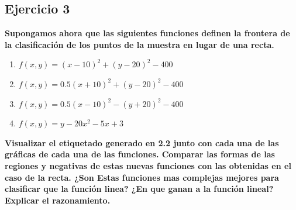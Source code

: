 \documentclass[titlepage]{article}
\begin{document}
\begin{enumerate}
	\end{enumerate}

	\subsection{Ejercicio 3}
	\textbf{Supongamos ahora que las siguientes funciones definen la frontera de la clasificación de los puntos de la muestra en lugar de una recta.}
	
	\begin{enumerate}
		\item 
		\textbf{$f(x,y) = (x-10)^2 + (y-20)^2 - 400$}
		
		\item 
		\textbf{$f(x,y) = 0.5(x+10)^2 + (y-20)^2 - 400$}
		
		\item 
		\textbf{$f(x,y) = 0.5(x-10)^2 - (y+20)^2 - 400$}
		
		\item 
		\textbf{$f(x,y) = y-20x^2-5x+3$}
	\end{enumerate}

	\textbf{Visualizar el etiquetado generado en 2.2 junto con cada una de las gráficas de cada una de las funciones. Comparar las formas de las regiones y negativas de estas nuevas funciones con las obtenidas en el caso de la recta. ¿Son Estas funciones mas complejas mejores para clasificar que la función linea? ¿En que ganan a la función lineal? Explicar el razonamiento.}
	
\end{document}
